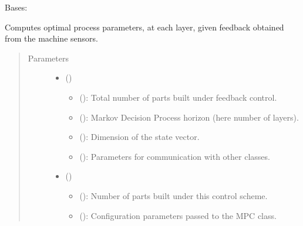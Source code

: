 \documentclass[letterpaper,10pt,english,openany,oneside]{sphinxmanual}
\begin{document}
\begin{fulllineitems}
\label{\detokenize{_modules/cluster:cluster.Cluster}}
Bases: 

Computes optimal process parameters, at each layer, given feedback obtained
from the machine sensors.
\begin{quote}\begin{description}
\item[{Parameters}] \leavevmode\begin{itemize}
\item {} 
 () \textendash{} \begin{itemize}
\item {} 
 (): Total number of parts built under feedback control.

\item {} 
 (): Markov Decision Process horizon (here number of layers).

\item {} 
 (): Dimension of the state vector.

\item {} 
 (): Parameters for communication with other classes.

\end{itemize}


\item {} 
 () \textendash{} \begin{itemize}
\item {} 
 (): Number of parts built under this control scheme.

\item {} 
 (): Configuration parameters passed to the MPC class.

\end{itemize}



\end{itemize}
\end{description}
\end{quote}
\end{fulllineitems}
\end{document}
